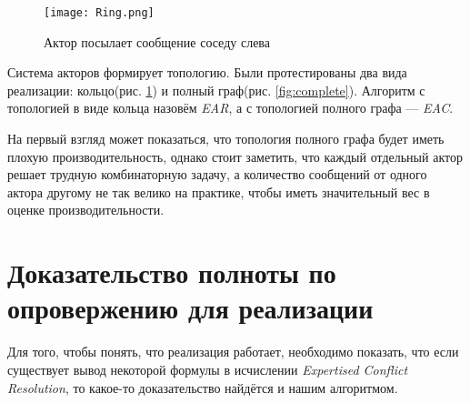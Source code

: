 \begin{figure}[!h]
\centering
\texttt{[image: Ring.png]}
\caption{Актор посылает сообщение соседу слева}\label{fig:ring}
\end{figure}

Система акторов формирует топологию. Были протестированы два вида реализации: кольцо(рис. \ref{fig:ring}) и полный граф(рис. \ref{fig:complete}). Алгоритм с топологией в виде кольца назовём \emph{EAR}, а с топологией полного графа --- \emph{EAC}. 

На первый взгляд может показаться, что топология полного графа будет иметь плохую производительность, однако стоит заметить, что каждый отдельный актор решает трудную комбинаторную задачу, а количество сообщений от одного актора другому не так велико на практике, чтобы иметь значительный вес в оценке производительности.

\section{Доказательство полноты по опровержению для реализации}
Для того, чтобы понять, что реализация работает, необходимо показать, что если существует вывод некоторой формулы в исчислении \emph{Expertised Conflict Resolution}, то какое-то доказательство найдётся и нашим алгоритмом. 

